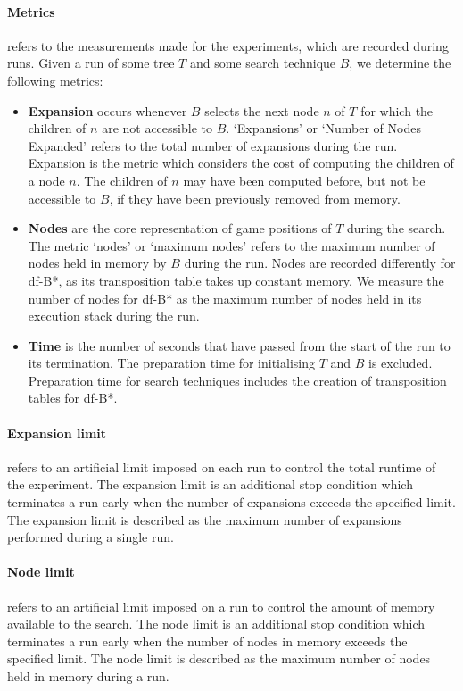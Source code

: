 \paragraph{Metrics}
refers to the measurements made for the experiments, which are recorded during runs. Given a run of some tree $T$ and some search technique $B$, we determine the following metrics:
\begin{itemize}
    \item \textbf{Expansion} occurs whenever $B$ selects the next node $n$ of $T$ for which the children of $n$ are not accessible to $B$. `Expansions' or `Number of Nodes Expanded' refers to the total number of expansions during the run. Expansion is the metric which considers the cost of computing the children of a node $n$. The children of $n$ may have been computed before, but not be accessible to $B$, if they have been previously removed from memory.
    \item \textbf{Nodes} are the core representation of game positions of $T$ during the search. The metric `nodes' or `maximum nodes' refers to the maximum number of nodes held in memory by $B$ during the run. Nodes are recorded differently for df-B*, as its transposition table takes up constant memory. We measure the number of nodes for df-B* as the maximum number of nodes held in its execution stack during the run.
    \item \textbf{Time} is the number of seconds that have passed from the start of the run to its termination. The preparation time for initialising $T$ and $B$ is excluded. Preparation time for search techniques includes the creation of transposition tables for df-B*.
\end{itemize}
\paragraph{Expansion limit}
refers to an artificial limit imposed on each run to control the total runtime of the experiment. The expansion limit is an additional stop condition which terminates a run early when the number of expansions exceeds the specified limit. The expansion limit is described as the maximum number of expansions performed during a single run.
\paragraph{Node limit}
refers to an artificial limit imposed on a run to control the amount of memory available to the search. The node limit is an additional stop condition which terminates a run early when the number of nodes in memory exceeds the specified limit. The node limit is described as the maximum number of nodes held in memory during a run.

